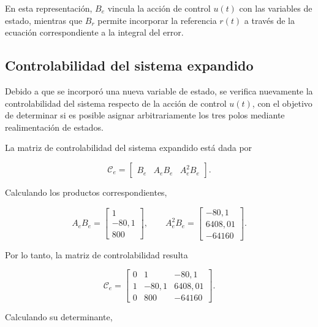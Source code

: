 \documentclass[10pt]{article}
\begin{document}
En esta representación, $B_e$ vincula la acción de
control $u(t)$ con las variables de estado, mientras
que $B_r$ permite incorporar la referencia $r(t)$
a través de la ecuación correspondiente a la
integral del error.


\subsection{Controlabilidad del sistema expandido}

Debido a que se incorporó una nueva variable de estado,
se verifica nuevamente la controlabilidad del sistema
respecto de la acción de control $u(t)$, con el objetivo
de determinar si es posible asignar arbitrariamente
los tres polos mediante realimentación de estados.

La matriz de controlabilidad del sistema expandido
está dada por

\begin{equation}
    \mathcal{C}_e=
    \begin{bmatrix}
        B_e & A_eB_e & A_e^2B_e
    \end{bmatrix}.
\end{equation}

Calculando los productos correspondientes,

\begin{equation}
    A_eB_e=
    \begin{bmatrix}
        1\\
        -80{,}1\\
        800
    \end{bmatrix},
    \qquad
    A_e^2B_e=
    \begin{bmatrix}
        -80{,}1\\
        6408{,}01\\
        -64160
    \end{bmatrix}.
\end{equation}

Por lo tanto, la matriz de controlabilidad resulta

\begin{equation}
    \mathcal{C}_e=
    \begin{bmatrix}
        0 & 1 & -80{,}1\\
        1 & -80{,}1 & 6408{,}01\\
        0 & 800 & -64160
    \end{bmatrix}.
\end{equation}

Calculando su determinante,
\end{document}
